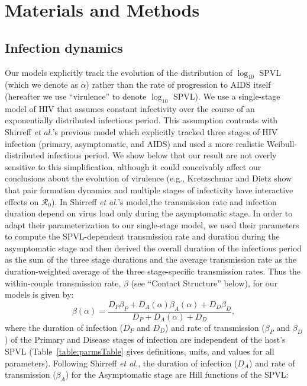 \documentclass[10pt,letterpaper]{article}
\newcommand{\Lspvl}{$\log_{10}$ SPVL}
\newcommand{\rzero}{{\mathcal R}_0}
\newcommand{\etal}{\textit{et al.}}
\begin{document}
\section*{Materials and Methods}

\subsection*{Infection dynamics}

Our models
explicitly track the evolution of the distribution of $\log_{10}$ SPVL
(which we denote as $\alpha$)
rather than the rate of progression to
AIDS itself (hereafter we use ``virulence'' to denote \Lspvl).
We use a single-stage model of HIV that assumes constant
infectivity over the course of an exponentially
distributed infectious period. This assumption contrasts
with Shirreff \etal's previous model which
explicitly tracked three stages of HIV infection (primary,
asymptomatic, and AIDS) and used a more realistic
Weibull-distributed infectious period.
We show below that our result
are not overly sensitive to this simplification,
although it could conceivably affect
our conclusions about the evolution of virulence (e.g., Kretzschmar and
Dietz \cite{kretzschmar_effect_1998} show that pair formation dynamics
and multiple stages of infectivity have interactive effects on
$\rzero$). 
In Shirreff \etal's model,the transmission rate
and infection duration depend on virus load only during the
asymptomatic stage. In order to adapt their parameterization to our
single-stage model, we used their parameters to compute the SPVL-dependent transmission
rate and duration during the asymptomatic stage and 
then derived the overall duration of the infectious period
as the sum of the three stage durations and the 
average transmission rate as the duration-weighted 
average of the three stage-specific transmission rates. 
Thus the within-couple transmission rate, $\beta$
(see ``Contact Structure'' below),
for our models is given by:
\begin{equation}
\beta (\alpha) = \frac{D_P \beta_P + D_A (\alpha) \beta_A (\alpha) + D_D \beta_D}{D_P + D_A (\alpha) + D_D},
\end{equation}
where the duration of infection ($D_P$ and $D_D$) and rate of transmission ($\beta_P$ and $\beta_D$) of the Primary and Disease stages
of infection are independent of the host's SPVL
(Table~\ref{table:parmsTable} gives definitions, units, and values for all parameters).
Following Shirreff \etal, the duration of infection ($D_A$) and rate of transmission ($\beta_A$) for the Asymptomatic stage are Hill functions of the SPVL:
\end{document}
